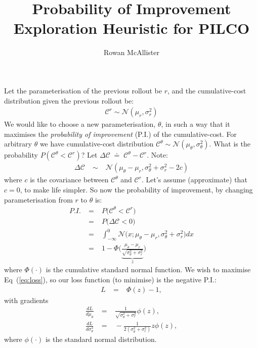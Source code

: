 \documentclass[a4paper,10pt]{article}
\title{Probability of Improvement \\ Exploration Heuristic for PILCO}
\author{Rowan McAllister}
\newcommand{\C}{\mathcal{C}}
\begin{document}
\maketitle

Let the parameterisation of the previous rollout be $r$,
and the cumulative-cost distribution given the previous rollout be:
\begin{eqnarray}
 \C^{r} \sim \mathcal{N}(\mu_r,\sigma^2_r)
\end{eqnarray}
%
We would like to choose a new parameterisation, $\theta$,
in such a way that it maximises the \textit{probability of improvement} (P.I.) of the cumulative-cost.
For arbitrary $\theta$ we have cumulative-cost distribution $\C^{\theta} \sim \mathcal{N}(\mu_\theta,\sigma^2_\theta)$. 
What is the probability $P(\C^{\theta} < \C^{r})$? Let $\Delta\C \;\doteq\; \C^{\theta} - \C^{r}$. Note:
\begin{eqnarray}
 \Delta\C \;&\sim&\; \mathcal{N}(\mu_\theta - \mu_r, \sigma^2_\theta + \sigma^2_r - 2c)
\end{eqnarray}
%
where $c$ is the covariance between $\C^{\theta}$ and $\C^{r}$. 
Let's assume (approximate) that $c = 0$, to make life simpler.
So now the probability of improvement, by changing parameterisation from $r$ to $\theta$ is:
\begin{eqnarray}
 P.I.
 \;&=&\; P \big( \C^{\theta} < \C^{r} \big) \\
 \;&=&\; P \big( \Delta\C < 0 \big) \\
 \;&=&\; \int_{-\infty}^0 \mathcal{N} \big( x ; \mu_\theta-\mu_r, \sigma^2_\theta + \sigma^2_r \big) dx \label{eq:pi} \\
 \;&=&\; 1-\Phi \Big( \underbrace{\frac{\mu_\theta-\mu_r}{\sqrt{\sigma^2_\theta + \sigma^2_r}}}_{z} \Big) \label{eq:loss}
\end{eqnarray} 
where $\Phi(\cdot)$ is the cumulative standard normal function.
%
We wish to maximise Eq~(\ref{eq:loss}), so our loss function (to minimise) is the negative P.I.:
\begin{eqnarray}
 L \;&=&\; \Phi (z)-1,
\end{eqnarray}
with gradients
\begin{eqnarray}
 \frac{dL}{d\mu_\theta} \;&=&\; \frac{1}{\sqrt{\sigma^2_\theta + \sigma^2_r}} \phi(z), \\
 \frac{dL}{d\sigma^2_\theta} \;&=&\; -\frac{1}{2(\sigma^2_\theta + \sigma^2_r)} z \phi(z),
\end{eqnarray}
where $\phi(\cdot)$ is the standard normal distribution.
\end{document}

